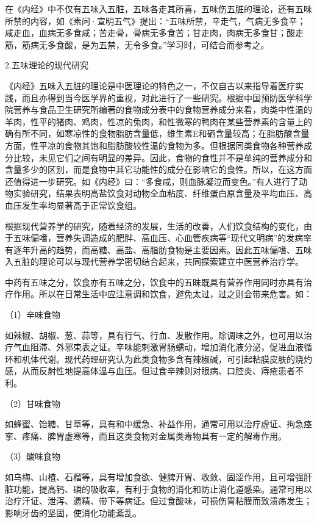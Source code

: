 \documentclass[draft,12pt]{ctexbook}
\begin{document}
在《内经》中不仅有五味入五脏，五味各走其所喜，五味伤五脏的理论，还有五味所禁的内容，如《素问·宣明五气》提出：“五味所禁，辛走气，气病无多食辛；咸走血，血病无多食咸；苦走骨，骨病无多食苦；甘走肉，肉病无多食甘；酸走筋，筋病无多食酸，是为五禁，无令多食。”学习时，可结合而参考之。

2.五味理论的现代研究

《内经》五味入五脏的理论是中医理论的特色之一，不仅自古以来指导着医疗实践，而且亦得到当今医学界的重视，对此进行了一些研究。根据中国预防医学科学院营养与食品卫生研究所编著的食物成分表中的食物营养成分来看，肉类中性温的羊肉，性平的猪肉、鸡肉，性凉的兔肉，和性微寒的鸭肉在某些营养素的含量上的确有所不同，如寒凉性的食物脂肪含量低，维生素E和硒含量较高；在脂肪酸含量方面，性平凉的食物其饱和脂肪酸较性温的食物为多。但根据同类食物各种营养成分比较，未见它们之间有明显的差异。因此，食物的食性并不是单纯的营养成分和含量多少的区别，而是食物中其它功能性的成分在影响它的食性。所以，在这方面还值得进一步研究。如《内经》曰：“多食咸，则血脉凝泣而变色。”有人进行了动物实验研究，结果表明高盐饮食对动物全血粘度、纤维蛋白原含量及平均血压、高血压发生率均显著髙于正常饮食组。

根据现代营养学的研究，随着经济的发展，生活的改善，人们饮食结构的变化，由于五味偏嗜，营养失调造成的肥胖、高血压、心血管疾病等“现代文明病”的发病率有逐年升高的趋势，而高糖、高盐、高脂肪食物是主要因素。因此五味偏嗜、五味入五脏的理论可以与现代营养学密切结合起来，共同探索建立中医营养治疗学。



中药有五味之分，饮食亦有五味之分，饮食中的五昧既具有营养作用同时亦具有治疗作用。所以在日常生活中应注意调和饮食，避免太过，过之则会带来危害。如：

（1）辛味食物

如辣椒、胡椒、葱、蒜等，具有行气、行血、发散作用。除调味之外，也可用以治疗气血阻滞、外邪束表之证。辛味能刺激胃肠蠕动，增加消化液分泌，促进血液循环和机体代谢。现代药理研究认为此类食物多含有辣椒碱，可引起粘膜皮肤的烧灼感，从而反射性地提高体温与血压。但过食辛辣则对眼病、口腔炎、痔疮患者不利。

（2）甘味食物

如蜂蜜、饴糖、甘草等，具有和中缓急、补益作用，通常可用以治疗虚证、拘急痉挛、疼痛、脾胃虚寒等，而且这类食物对金属类毒物具有一定的解毒作用。

（3）酸味食物

如乌梅、山楂、石榴等，具有增加食欲、健脾开胃、收敛、固涩作用，且可增强肝脏功能，提高钙、磷的吸收率，有利于食物的消化和防止消化道感染。通常可用以治疗汗证、泄泻、遗精、带下等病证。但过食酸味，可损伤胃粘膜而致溃疡发生；影响牙齿的坚固，使消化功能紊乱。
\end{document}
